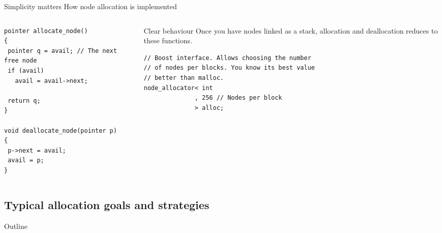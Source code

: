 \documentclass[10pt,aspectratio=169]{beamer}
\begin{document}
\begin{frame}[fragile]
{Simplicity matters}
{How node allocation is implemented}

\begin{columns}
\begin{column}{0.47\textwidth}
\begin{lstlisting}
pointer allocate_node()
{
 pointer q = avail; // The next free node
 if (avail)
   avail = avail->next;

 return q;
}

void deallocate_node(pointer p)
{
 p->next = avail;
 avail = p;
}
\end{lstlisting}
\end{column}
\begin{column}{0.47\textwidth}
\begin{block} {Clear behaviour}
Once you have nodes linked as a stack, allocation and
deallocation reduces to these functions.
\end{block}
\begin{lstlisting}
// Boost interface. Allows choosing the number
// of nodes per blocks. You know its best value
// better than malloc.
node_allocator< int
              , 256 // Nodes per block
              > alloc;
\end{lstlisting}
\end{column}
\end{columns}
\end{frame}

\subsection{Typical allocation goals and strategies}

\begin{frame}{Outline}
\end{frame}
\end{document}
